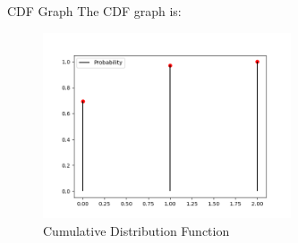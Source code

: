 \documentclass{beamer}
\begin{document}
\begin{frame}{CDF Graph}
The CDF graph is:
    \begin{figure}[!ht]
		\centering
		\includegraphics[width=\textwidth,height=5.5cm,keepaspectratio]{figures/CDF.png}
		\caption{Cumulative Distribution Function}
		\label{fig2}
	\end{figure}
\end{frame}
\end{document}
